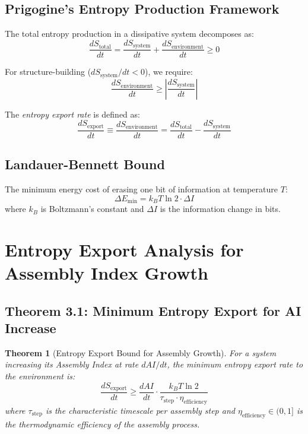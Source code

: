 \documentclass[11pt,a4paper]{article}
\newtheorem{theorem}{Theorem}[section]
\begin{document}
\subsection{Prigogine's Entropy Production Framework}

The total entropy production in a dissipative system decomposes as:
\begin{equation}
\frac{dS_{\text{total}}}{dt} = \frac{dS_{\text{system}}}{dt} + \frac{dS_{\text{environment}}}{dt} \geq 0
\end{equation}

For structure-building ($dS_{\text{system}}/dt < 0$), we require:
\begin{equation}
\frac{dS_{\text{environment}}}{dt} \geq \left|\frac{dS_{\text{system}}}{dt}\right|
\end{equation}

The \emph{entropy export rate} is defined as:
\begin{equation}
\boxed{\frac{dS_{\text{export}}}{dt} \equiv \frac{dS_{\text{environment}}}{dt} = \frac{dS_{\text{total}}}{dt} - \frac{dS_{\text{system}}}{dt}}
\end{equation}

\subsection{Landauer-Bennett Bound}

The minimum energy cost of erasing one bit of information at temperature $T$:
\begin{equation}
\boxed{\Delta E_{\min} = k_B T \ln 2 \cdot \Delta I}
\end{equation}
where $k_B$ is Boltzmann's constant and $\Delta I$ is the information change in bits.

\section{Entropy Export Analysis for Assembly Index Growth}

\subsection{Theorem 3.1: Minimum Entropy Export for AI Increase}

\begin{theorem}[Entropy Export Bound for Assembly Growth]
For a system increasing its Assembly Index at rate $dAI/dt$, the minimum entropy export rate to the environment is:
\begin{equation}
\boxed{\frac{dS_{\text{export}}}{dt} \geq \frac{dAI}{dt} \cdot \frac{k_B T \ln 2}{\tau_{\text{step}} \cdot \eta_{\text{efficiency}}}}
\end{equation}
where $\tau_{\text{step}}$ is the characteristic timescale per assembly step and $\eta_{\text{efficiency}} \in (0,1]$ is the thermodynamic efficiency of the assembly process.
\end{theorem}
\end{document}
